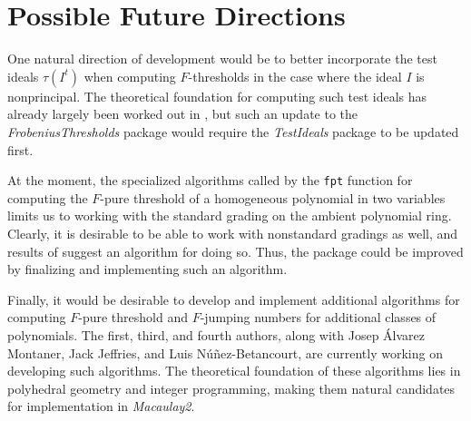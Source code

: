 \documentclass{amsart}
\begin{document}
\section{Possible Future Directions}
\label{sec.FutureDirections}

One natural direction of development would be to better incorporate the test ideals $\tau(I^t)$ when computing $F$-thresholds in the case where the ideal $I$ is nonprincipal.
The theoretical foundation for computing such test ideals has already largely been worked out in \cite{SchwedeTuckerTestIdealsOfNonPrincipal}, but such an update to the \emph{FrobeniusThresholds} package would require the  \emph{TestIdeals} package to be updated first.

At the moment, the specialized algorithms called by the \texttt{fpt} function for computing the $F$-pure threshold of a homogeneous polynomial in two variables limits us to working with the standard grading on the ambient polynomial ring.  Clearly, it is desirable to be able to work with nonstandard gradings as well, and results of \cite{HernandezTeixeiraFThresholdFunctions} suggest an algorithm for doing so.  Thus, the package could be improved by finalizing and implementing such an algorithm.

Finally, it would be desirable to develop and implement additional algorithms for computing $F$-pure threshold and $F$-jumping numbers for additional classes of polynomials.  The first, third, and fourth authors, along with Josep \'Alvarez Montaner, Jack Jeffries, and Luis N\'u\~nez-Betancourt,  are currently working on developing such algorithms.  The theoretical foundation of these algorithms lies in polyhedral geometry and integer programming, making them natural candidates for  implementation in \emph{Macaulay2}.  




\end{document}
